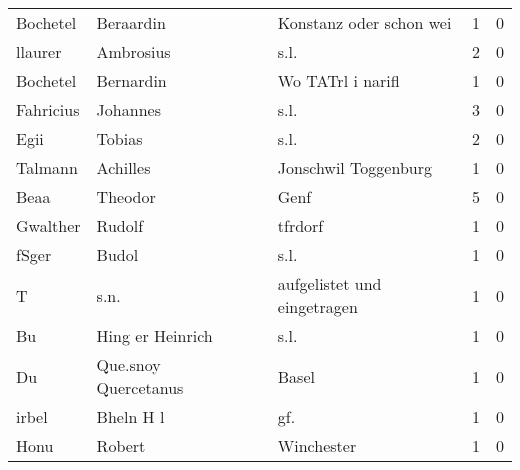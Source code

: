 \begin{tabular}{llllrr}
                 Bochetel &                          Beraardin &             &                     Konstanz oder schon wei &          1 &         0 \\
                  llaurer &                          Ambrosius &             &                                        s.l. &          2 &         0 \\
                 Bochetel &                          Bernardin &             &                           Wo TATrl i narifl &          1 &         0 \\
                Fahricius &                           Johannes &             &                                        s.l. &          3 &         0 \\
                     Egii &                             Tobias &             &                                        s.l. &          2 &         0 \\
                  Talmann &                           Achilles &             &                        Jonschwil Toggenburg &          1 &         0 \\
                     Beaa &                            Theodor &             &                                        Genf &          5 &         0 \\
                 Gwalther &                             Rudolf &             &                                     tfrdorf &          1 &         0 \\
                    fSger &                              Budol &             &                                        s.l. &          1 &         0 \\
                        T &                               s.n. &             &                 aufgelistet und eingetragen &          1 &         0 \\
                       Bu &                   Hing er Heinrich &             &                                        s.l. &          1 &         0 \\
                       Du &               Que.snoy Quercetanus &             &                                       Basel &          1 &         0 \\
                    irbel &                          Bheln H l &             &                                        gf.  &          1 &         0 \\
                     Honu &                             Robert &             &                                  Winchester &          1 &         0 \\

\end{tabular}
